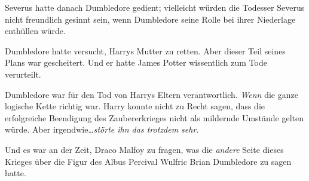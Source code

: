 Severus hatte danach Dumbledore gedient; vielleicht würden die Todesser Severus nicht freundlich gesinnt sein, wenn Dumbledore seine Rolle bei ihrer Niederlage enthüllen würde.

Dumbledore hatte versucht, Harrys Mutter zu retten. Aber dieser Teil seines Plans war gescheitert. Und er hatte James Potter wissentlich zum Tode verurteilt.

Dumbledore war für den Tod von Harrys Eltern verantwortlich. \emph{Wenn} die ganze logische Kette richtig war. Harry konnte nicht zu Recht sagen, dass die erfolgreiche Beendigung des Zaubererkrieges nicht als mildernde Umstände gelten würde. Aber irgendwie…\emph{störte ihn das trotzdem sehr}.

Und es war an der Zeit, Draco Malfoy zu fragen, was die \emph{andere} Seite dieses Krieges über die Figur des Albus Percival Wulfric Brian Dumbledore zu sagen hatte.

